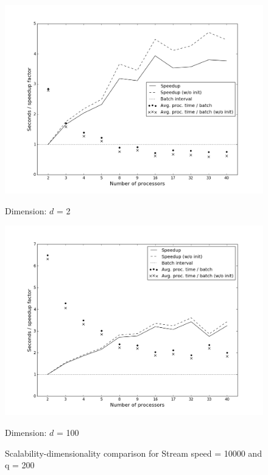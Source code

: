 \begin{figure}[!ht]
        \begin{minipage}[l]{1.0\columnwidth}
            \centering
             \includegraphics[width=0.9\columnwidth]{./styles/perf200-2.png}
            \caption{Dimension: $d$ = 2}
            \label{fig:perf200-2}
        \end{minipage}
        \hfill{}
        \begin{minipage}[r]{1.0\columnwidth}
            \centering
            \includegraphics[width=0.9\columnwidth]{./styles/perf200-100.png}
            \caption{Dimension: $d$ = 100}\label{fig:perf200-100}
        \end{minipage}
        \captionsetup{labelformat=empty}     
        \caption{Scalability-dimensionality comparison for Stream speed = 10000 and q = 200}
        \label{fig:DS2quality}
\end{figure}


